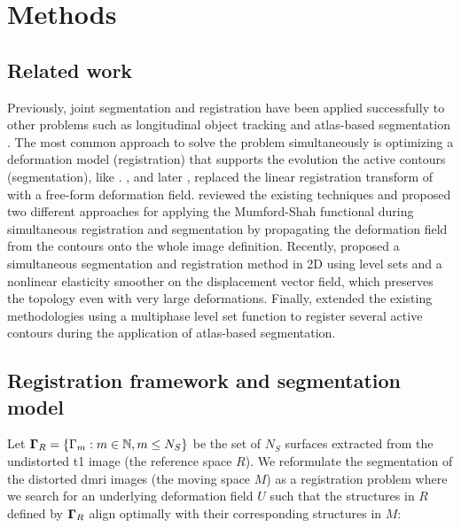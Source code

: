 \section{Methods}
\label{sec:methods}
\subsection{Related work}\label{sec:related_work}
Previously, joint segmentation and registration have been applied successfully to other problems
such as longitudinal object tracking \citep{paragios_level_2003} and atlas-based
  segmentation \citep{gorthi_active_2011}.
The most common approach to solve the problem simultaneously is optimizing a deformation model
  (registration) that supports the evolution the active contours (segmentation), like
  \citep{paragios_level_2003,yezzi_variational_2003}.
\cite{unal_coupled_2005}, and later \cite{wang_joint_2006}, replaced the linear registration
  transform of \citep{yezzi_variational_2003} with a free-form deformation field.
\cite{droske_mumfordshah_2009} reviewed the existing techniques and proposed two different
  approaches for applying the Mumford-Shah functional \citep{mumford_optimal_1989} during simultaneous
  registration and segmentation by propagating the deformation field from
  the contours onto the whole image definition.
Recently, \cite{guyader_combined_2011} proposed a simultaneous segmentation and
  registration method in 2D using level sets and a nonlinear elasticity smoother on the
  displacement vector field, which preserves the topology even with very large deformations.
Finally, \cite{gorthi_active_2011} extended the existing methodologies using a multiphase
  level set function to register several active contours during the application
  of atlas-based segmentation.


\subsection{Registration framework and segmentation model}\label{sec:methods_map}
Let $\boldsymbol{\Gamma}_R = \{\Gamma_m: m \in \mathbb{N}, m \leq N_S\}$ be the set of $N_S$ surfaces
  extracted from the undistorted \gls*{t1} image (the reference space $R$).
We reformulate the segmentation of the distorted \gls*{dmri} images (the moving space $M$)
  as a registration problem where we search for an underlying deformation field $U$ such that
  the structures in $R$ defined by $\boldsymbol{\Gamma}_R$ align optimally with their corresponding
  structures in $M$:

